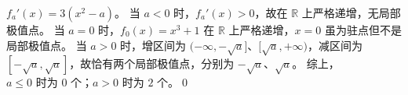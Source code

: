 $f_a'(x)=3(x^2-a)$。
当 $a<0$ 时，$f_a'(x)>0$，故在 $\mathbb R$ 上严格递增，无局部极值点。
当 $a=0$ 时，$f_0(x)=x^3+1$ 在 $\mathbb R$ 上严格递增，$x=0$ 虽为驻点但不是局部极值点。
当 $a>0$ 时，增区间为 $(-\infty,-\sqrt a]$、$[\sqrt a,+\infty)$，减区间为 $[-\sqrt a,\sqrt a]$，故恰有两个局部极值点，分别为 $-\sqrt a$、$\sqrt a$。
综上，$\boxed{a\le0\text{ 时为 }0\text{ 个；}a>0\text{ 时为 }2\text{ 个}}$。\qed
